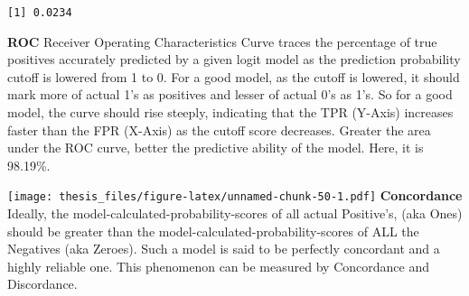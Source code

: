 \documentclass[12pt,twoside]{reedthesis}
\newenvironment{Shaded}{\begin{snugshade}}{\end{snugshade}}
\newcommand{\KeywordTok}[1]{\textcolor[rgb]{0.13,0.29,0.53}{\textbf{{#1}}}}
\newcommand{\NormalTok}[1]{{#1}}
\theoremstyle{definition}
\theoremstyle{definition}
\theoremstyle{definition}
\theoremstyle{remark}
\begin{document}
\begin{verbatim}
[1] 0.0234
\end{verbatim}
\hfill\break
\textbf{ROC} \hfill\break
Receiver Operating Characteristics Curve traces the percentage of true
positives accurately predicted by a given logit model as the prediction
probability cutoff is lowered from 1 to 0. For a good model, as the
cutoff is lowered, it should mark more of actual 1's as positives and
lesser of actual 0's as 1's. So for a good model, the curve should rise
steeply, indicating that the TPR (Y-Axis) increases faster than the FPR
(X-Axis) as the cutoff score decreases. Greater the area under the ROC
curve, better the predictive ability of the model. Here, it is 98.19\%.
\begin{Shaded}
\end{Shaded}
\texttt{[image: thesis\_files/figure-latex/unnamed-chunk-50-1.pdf]}
\hfill\break
\textbf{Concordance} \hfill\break
Ideally, the model-calculated-probability-scores of all actual
Positive's, (aka Ones) should be greater than the
model-calculated-probability-scores of ALL the Negatives (aka Zeroes).
Such a model is said to be perfectly concordant and a highly reliable
one. This phenomenon can be measured by Concordance and Discordance.
\end{document}
